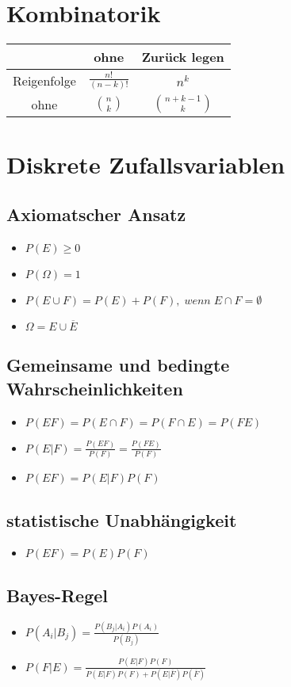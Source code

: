 \documentclass{article}
\begin{document}
\section{Kombinatorik}
\begin{tabular}{c| c |c}
  & ohne & Zurück legen \\ \hline
  Reigenfolge & $\frac{n!}{(n-k)!}$&$n^k$ \\
  ohne&${n \choose k}$ & ${n + k -1 \choose k}$ \\
  
\end{tabular}

\section{Diskrete Zufallsvariablen}
\subsection{Axiomatscher Ansatz}
\begin{itemize}
\item $P(E)\geq 0$
\item $P(\Omega) = 1$
\item $P(E\cup F) = P(E)+P(F), \; wenn\;  E\cap F = \emptyset $
\item $\Omega = E \cup \overline{E}$
\end{itemize}


\subsection{Gemeinsame und bedingte Wahrscheinlichkeiten}
\begin{itemize}
\item$P(EF) = P(E\cap F) = P(F \cap E) = P(FE)$
\item $P(E|F) = \frac{P(EF)}{P(F)} = \frac{P(FE)}{P(F)}$
\item $P(EF) = P(E|F)P(F)$
\end{itemize}




\subsection{statistische Unabhängigkeit}
\begin{itemize}
\item $P(EF) = P(E) P(F)$
\end{itemize}

\subsection{Bayes-Regel}
\begin{itemize}
\item $P(A_i|B_j) = \frac{P(B_j|A_i)P(A_i)}{P(B_j)}$
\item $P(F|E) = \frac{P(E|F) P(F)}{P(E|F) P(F)+P(E|\overline{F})P(\overline{F})}$
\end{itemize}
\end{document}

